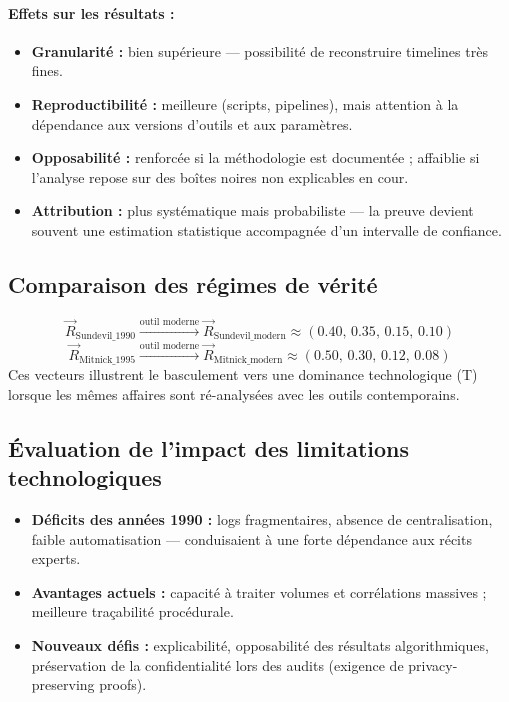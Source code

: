 \documentclass[memoire, 12pt]{report}
\begin{document}
\paragraph{Effets sur les résultats :}
\begin{itemize}
  \item \textbf{Granularité :} bien supérieure — possibilité de reconstruire timelines très fines.
  \item \textbf{Reproductibilité :} meilleure (scripts, pipelines), mais attention à la dépendance aux versions d'outils et aux paramètres.
  \item \textbf{Opposabilité :} renforcée si la méthodologie est documentée ; affaiblie si l'analyse repose sur des boîtes noires non explicables en cour.
  \item \textbf{Attribution :} plus systématique mais probabiliste — la preuve devient souvent une estimation statistique accompagnée d'un intervalle de confiance.
\end{itemize}

\subsection*{Comparaison des régimes de vérité}
\[
\vec{R}_{\text{Sundevil\_1990}} \xrightarrow{\text{outil moderne}} \vec{R}_{\text{Sundevil\_modern}} \approx (0.40,\,0.35,\,0.15,\,0.10)
\]
\[
\vec{R}_{\text{Mitnick\_1995}} \xrightarrow{\text{outil moderne}} \vec{R}_{\text{Mitnick\_modern}} \approx (0.50,\,0.30,\,0.12,\,0.08)
\]
Ces vecteurs illustrent le basculement vers une dominance technologique (T) lorsque les mêmes affaires sont ré-analysées avec les outils contemporains.

\subsection*{Évaluation de l'impact des limitations technologiques}
\begin{itemize}
  \item \textbf{Déficits des années 1990 :} logs fragmentaires, absence de centralisation, faible automatisation — conduisaient à une forte dépendance aux récits experts.
  \item \textbf{Avantages actuels :} capacité à traiter volumes et corrélations massives ; meilleure traçabilité procédurale.
  \item \textbf{Nouveaux défis :} explicabilité, opposabilité des résultats algorithmiques, préservation de la confidentialité lors des audits (exigence de privacy-preserving proofs).
\end{itemize}
\end{document}

